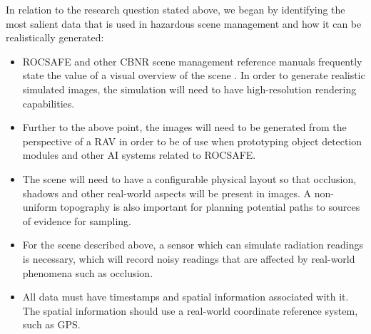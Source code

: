 \par In relation to the research question stated above, we began by identifying the most salient data that is used in hazardous scene management and how it can be realistically generated: 
\begin{itemize}
    \item ROCSAFE and other CBNR scene management reference manuals frequently state the value of a visual overview of the scene \cite{StandardizationOffice2012AJP-3.8ADefence}. In order to generate realistic simulated images, the simulation will need to have high-resolution rendering capabilities.
    \item Further to the above point, the images will need to be generated from the perspective of a RAV in order to be of use when prototyping object detection modules and other AI systems related to ROCSAFE.%
    \item The scene will need to have a configurable physical layout so that occlusion, shadows and other real-world aspects will be present in images. A non-uniform topography is also important for planning potential paths to sources of evidence for sampling.
    \item For the scene described above, a sensor which can simulate radiation readings is necessary, which will record noisy readings that are affected by real-world phenomena such as occlusion.
    \item All data must have timestamps and spatial information associated with it. The spatial information should use a real-world coordinate reference system, such as GPS.
\end{itemize}

